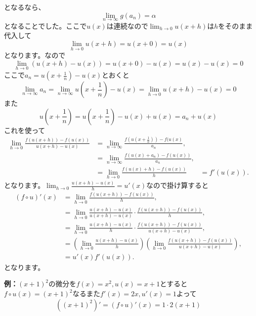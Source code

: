 \documentclass{ltjsarticle}
\begin{document}
となるなら、
\begin{equation*}
\lim_{n\to \infty}g(a_n) = \alpha
\end{equation*}
となることでした。ここで$u(x)$は連続なので$\lim_{h\to 0}u(x+h)$は$h$をそのまま代入して
\begin{equation*}
\lim_{h\to0}u(x+h) = u(x+0) =  u(x)
\end{equation*}
となります。なので
\begin{equation*}
\lim_{h\to 0}(u(x+h)-u(x)) =   u(x+0) - u(x) = u(x)-u(x) = 0
\end{equation*}
ここで$a_n = u\left(x+{\frac 1 n}\right)-u(x)$とおくと
\begin{equation*}
\lim_{n\to\infty}a_n = \lim_{n\to\infty}u\left(x+{\frac 1 n}\right)-u(x) = \lim_{h\to 0 }u(x+h)-u(x) = 0
\end{equation*}
また
\begin{equation*}
u\left(x+{\frac 1 n}\right) = u\left(x+{\frac 1 n}\right) - u(x)+u(x) = a_n+u(x)
\end{equation*}
これを使って
\begin{align*}
 \lim_{h\to 0}{\frac {f(u(x+h))-f(u(x))} {u(x+h)-u(x)}} &=  \lim_{n\to \infty}{\frac {f\left(u\left(x+{\frac 1 n}\right)\right)-f(u(x)} {a_n}},\\
 &=\lim_{n\to \infty}{\frac {f(u(x)+a_n)-f(u(x))} {a_n}},\\
 & = \lim_{h\to0}{\frac {f(u(x)+h)-f(u(x))} {h}}
 & = f'(u(x)).
\end{align*}
となります。$\lim_{h\to 0}{\frac {u(x+h)-u(x)} {h}} = u'(x)$なので掛け算すると
\begin{align*}
(f\circ u)'(x)&= \lim_{h\to 0}{\frac {f(u(x+h))-f(u(x))} {h}},\\
& = \lim_{h\to 0}{\frac {u(x+h)-u(x)} {u(x+h)-u(x)}}\cdot{\frac {f(u(x+h))-f(u(x))} {h}},\\
& = \lim_{h\to 0}{\frac {u(x+h)-u(x)} {h}}\cdot{\frac {f(u(x+h))-f(u(x))} {u(x+h)-u(x)}},\\
& = \left(\lim_{h\to 0}{\frac {u(x+h)-u(x)} {h}}\right)\left(\lim_{h\to0}{\frac {f(u(x+h))-f(u(x))} {u(x+h)-u(x)}}\right),\\
&= u'(x)f'(u(x)).
\end{align*}
となります。
\par\textbf{例：}$(x+1)^2$の微分を$f(x) = x^2,u(x) = x+1$とすると$f\circ u(x) = (x+1)^2$なるまた$f'(x) = 2x,u'(x) = 1$よって
\begin{equation*}
((x+1)^2)' = (f\circ u)'(x) = 1\cdot 2(x+1)
\end{equation*}
\end{document}
